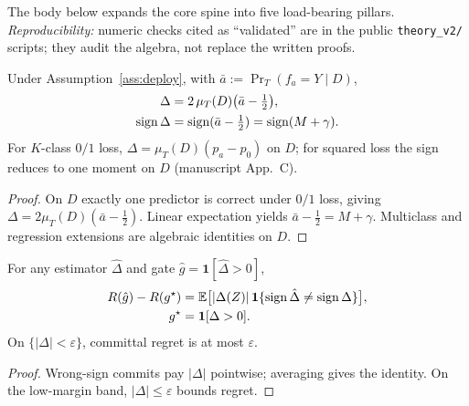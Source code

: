 
The body below expands the core spine into five load-bearing pillars.
\emph{Reproducibility:} numeric checks cited as ``validated'' are in the public
\texttt{theory\_v2/} scripts; they audit the algebra, not replace the written proofs.

\begin{lemma}\label{lem:reduction}\label{thm:disagree}
Under Assumption~\ref{ass:deploy}, with $\bar a:=\Pr_T(f_a{=}Y\mid D)$,
\begin{align*}
\Delta &= 2\,\mu_T(D)\bigl(\bar a-\tfrac12\bigr),\\
\operatorname{sign}\Delta &= \operatorname{sign}(\bar a-\tfrac12) = \operatorname{sign}(M+\gamma).
\end{align*}
For $K$-class $0/1$ loss, $\Delta=\mu_T(D)(p_a-p_0)$ on $D$; for squared loss the sign reduces
to one moment on $D$ (manuscript App.~C).
\end{lemma}
\begin{proof}
On $D$ exactly one predictor is correct under $0/1$ loss, giving
$\Delta=2\mu_T(D)(\bar a-\tfrac12)$. Linear expectation yields $\bar a-\tfrac12=M+\gamma$.
Multiclass and regression extensions are algebraic identities on $D$.
\end{proof}

\begin{lemma}\label{lem:gate}\label{thm:gate}
For any estimator $\hat\Delta$ and gate $\hat g=\mathbf 1[\hat\Delta>0]$,
\begin{align*}
R(\hat g)-R(g^\star)
  &=\mathbb{E}\bigl[|\Delta(Z)|\,\mathbf 1\{\operatorname{sign}\hat\Delta\neq\operatorname{sign}\Delta\}\bigr],\\
g^\star&=\mathbf 1[\Delta>0].
\end{align*}
On $\{|\Delta|<\varepsilon\}$, committal regret is at most $\varepsilon$.
\end{lemma}
\begin{proof}
Wrong-sign commits pay $|\Delta|$ pointwise; averaging gives the identity. On the low-margin
band, $|\Delta|\le\varepsilon$ bounds regret.
\end{proof}

